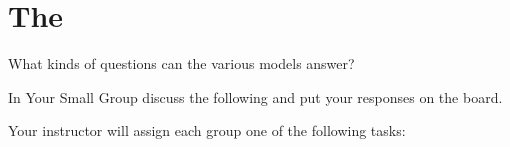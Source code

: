 \section{The \FModel{}}
\label{act8.2.2}

\begin{fnt}
	
\end{fnt}

\begin{fnt}
	
\end{fnt}

\begin{fnt}
	
\end{fnt}

%	

What kinds of questions can the various models answer?

In Your Small Group discuss the following and put your responses on the board.

Your instructor will assign each group one of the following tasks:

